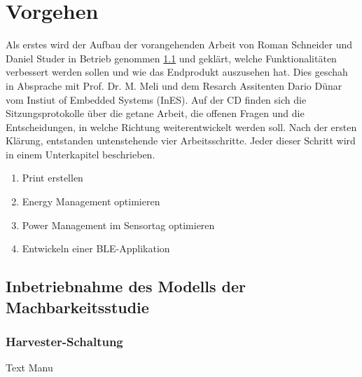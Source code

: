 \chapter{Vorgehen}
 
Als erstes wird der Aufbau der vorangehenden Arbeit von Roman Schneider und Daniel Studer \cite{PA_bicycle} in Betrieb genommen \ref{v_inbetriebnahme} und geklärt, welche Funktionalitäten verbessert werden sollen und wie das Endprodukt auszusehen hat. Dies geschah in Absprache mit Prof. Dr. M. Meli und dem Resarch Assitenten Dario Dünar vom Instiut of Embedded Systems (InES). Auf der CD finden sich die Sitzungsprotokolle über die getane Arbeit, die offenen Fragen und die Entscheidungen, in welche Richtung weiterentwickelt werden soll. Nach der ersten Klärung, entstanden untenstehende vier Arbeitsschritte. Jeder dieser Schritt wird in einem Unterkapitel beschrieben.

\begin{enumerate}
  \item Print erstellen
  \item Energy Management optimieren
  \item Power Management im Sensortag optimieren
  \item Entwickeln einer BLE-Applikation
 \end{enumerate}  


 
\section{Inbetriebnahme des Modells der Machbarkeitsstudie}\label{v_inbetriebnahme} 


\subsection{Harvester-Schaltung}

Text Manu

